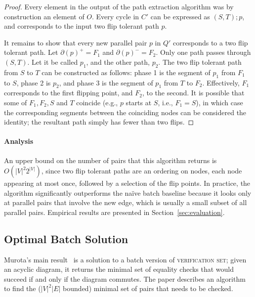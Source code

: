 \documentclass[sigplan,review,nonacm=true]{acmart}
\begin{document}
\begin{proof}
    Every element in the output of the path extraction algorithm was by construction an element of $O$. Every cycle in $C'$ can be expressed as $(S, T) ; p$, and corresponds to the input two flip tolerant path $p$.
    
    It remains to show that every new parallel pair $p$ in $Q'$ corresponds to a two flip tolerant path.
    Let $\partial(p)^+ = F_1$ and $\partial(p)^- = F_2$. 
    Only one path passes through $(S, T)$. Let it be called $p_1$, and the other path, $p_2$.
    The two flip tolerant path from $S$ to $T$ can be constructed as follows: phase 1 is the segment of $p_1$ from $F_1$ to $S$, phase 2 is $p_2$, and phase 3 is the segment of $p_1$ from $T$ to $F_2$.
    Effectively, $F_1$ corresponds to the first flipping point, and $F_2$, to the second.
    It is possible that some of $F_1, F_2, S$ and $T$ coincide (e.g., $p$ starts at $S$, i.e., $F_1 = S$), in which case the corresponding segments between the coinciding nodes can be considered the identity; the resultant path simply has fewer than two flips.
\end{proof}

\paragraph{Analysis}
An upper bound on the number of pairs that this algorithm returns is $O(|V|^{2} 2^{|V|})$, since two flip tolerant paths are an ordering on nodes, each node appearing at most once, followed by a selection of the flip points.
In practice, the algorithm significantly outperforms the na\"{i}ve batch baseline because it looks only at parallel pairs that involve the new edge, which is usually a small subset of all parallel pairs.
Empirical results are presented in Section~\ref{sec:evaluation}.

\subsection{Optimal Batch Solution}

\label{sec:batchBaseline}

Murota's main result~\cite{commutative} is a solution to a batch version of \textsc{verification set}; given an acyclic diagram, it returns the minimal set of equality checks that would succeed if and only if the diagram commutes.
The paper describes an algorithm to find the ($|V|^2|E|$ bounded) minimal set of pairs that needs to be checked.
\end{document}
